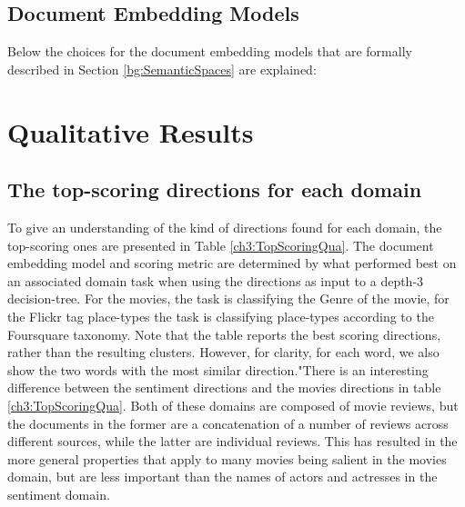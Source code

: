 \subsection{Document Embedding Models}

Below the choices for the document embedding models that are formally described in Section \ref{bg:SemanticSpaces} are explained:



\section{Qualitative Results}



\subsection{The top-scoring directions for each domain}

To give an understanding of the kind of directions found for each domain, the top-scoring ones are presented in Table \ref{ch3:TopScoringQua}. The document embedding model and scoring metric are determined by what performed best on an associated domain task when using the directions as input to a depth-3 decision-tree. For the movies, the task is classifying the Genre of the movie, for the Flickr tag place-types the task is classifying place-types according to the Foursquare taxonomy. Note that the table reports the best scoring directions, rather than the resulting clusters. However, for clarity, for each word, we also show the two words with the most similar direction."There is an  interesting difference between the sentiment directions and the movies directions in table \ref{ch3:TopScoringQua}. Both of these domains are composed of movie reviews, but the documents in the former are a concatenation of a number of reviews across different sources, while the latter are individual reviews. This has resulted in the more general properties that apply to many movies being salient in the movies domain, but are less important than the names of actors and actresses in the sentiment domain. 

